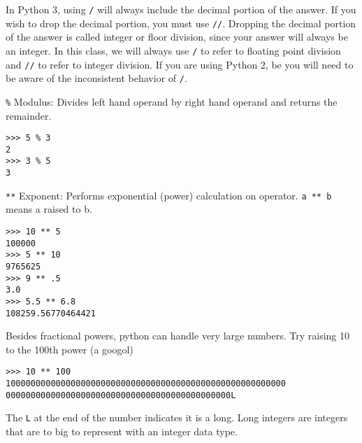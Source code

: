 \documentclass[12pt]{article}
\begin{document}
In Python 3, using \texttt{/} will always include the decimal portion of the answer. If you wish to drop the decimal portion, you must use \texttt{//}. Dropping the decimal portion of the answer is called integer or floor division, since your answer will always be an integer. In this class, we will always use \texttt{/} to refer to floating point division and \texttt{//} to refer to integer division. If you are using Python 2, be you will need to be aware of the inconsistent behavior of \texttt{/}.



\texttt{\%} Modulus: Divides left hand operand by right hand operand and returns the remainder.

\begin{lstlisting}[style=bash]
>>> 5 % 3
2
>>> 3 % 5
3
\end{lstlisting}

\texttt{**} Exponent: Performs exponential (power) calculation on operator. \texttt{a ** b} means a raised to b.

\begin{lstlisting}[style=bash]
>>> 10 ** 5
100000
>>> 5 ** 10 
9765625
>>> 9 ** .5
3.0
>>> 5.5 ** 6.8
108259.56770464421
\end{lstlisting}

Besides fractional powers, python can handle very large numbers. Try raising 10 to the 100th power (a googol)

\begin{lstlisting}[style=bash]
>>> 10 ** 100
10000000000000000000000000000000000000000000000000000000
000000000000000000000000000000000000000000000L
\end{lstlisting}

The \texttt{L} at the end of the number indicates it is a long. Long integers are integers that are to big to represent with an integer data type.  


\end{document}
